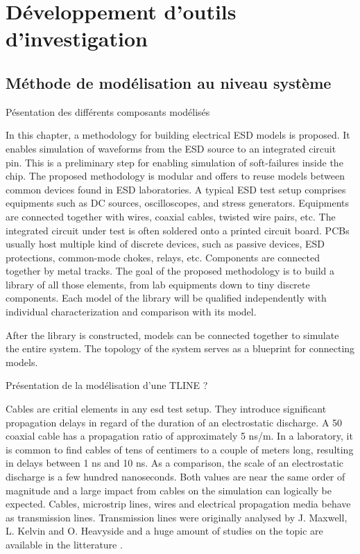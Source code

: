 \chapter{Développement d'outils d'investigation}
\label{chap:2}
\section{Méthode de modélisation au niveau système}

Pésentation des différents composants modélisés

In this chapter, a methodology for building electrical ESD models is proposed.
It enables simulation of waveforms from the ESD source to an integrated circuit pin.
This is a preliminary step for enabling simulation of soft-failures inside the chip.
The proposed methodology is modular and offers to reuse models between common devices found in ESD laboratories.
A typical ESD test setup comprises equipments such as DC sources, oscilloscopes, and stress generators.
Equipments are connected together with wires, coaxial cables, twisted wire pairs, etc.
The integrated circuit under test is often soldered onto a printed circuit board.
\gls{PCB}s usually host multiple kind of discrete devices, such as passive devices, ESD protections, common-mode chokes, relays, etc.
Components are connected together by metal tracks.
The goal of the proposed methodology is to build a library of all those elements, from lab equipments down to tiny discrete components.
Each model of the library will be qualified independently with individual characterization and comparison with its model.

After the library is constructed, models can be connected together to simulate the entire system.
The topology of the system serves as a blueprint for connecting models.

Présentation de la modélisation d'une TLINE ?

Cables are critial elements in any \gls{esd} test setup.
They introduce significant propagation delays in regard of the duration of an electrostatic discharge.
A 50\textOmega{} coaxial cable has a propagation ratio of approximately 5 ns/m.
In a laboratory, it is common to find cables of tens of centimers to a couple of meters long, resulting in delays between 1 ns and 10 ns.
As a comparison, the scale of an electrostatic discharge is a few hundred nanoseconds.
Both values are near the same order of magnitude and a large impact from cables on the simulation can logically be expected.
Cables, microstrip lines, wires and electrical propagation media behave as transmission lines.
Transmission lines were originally analysed by J. Maxwell, L. Kelvin and O. Heavyside and a huge amount of studies on the topic are available in the litterature \cite{branin-tl-ref, hf-coax,lossy-tl,emc-analysis-tl}.

